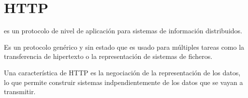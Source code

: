 
\section{HTTP}

 es un protocolo de nivel de aplicación
para sistemas de información distribuidos.

Es un protocolo genérico y sin estado que es usado para múltiples tareas como
la transferencia de hipertexto o la representación de sistemas de ficheros.

Una característica de HTTP es la negociación de la representación de los datos,
lo que permite construir sistemas indpendientemente de los datos que se vayan a
transmitir. \emph{\parencite{Reference18}}

